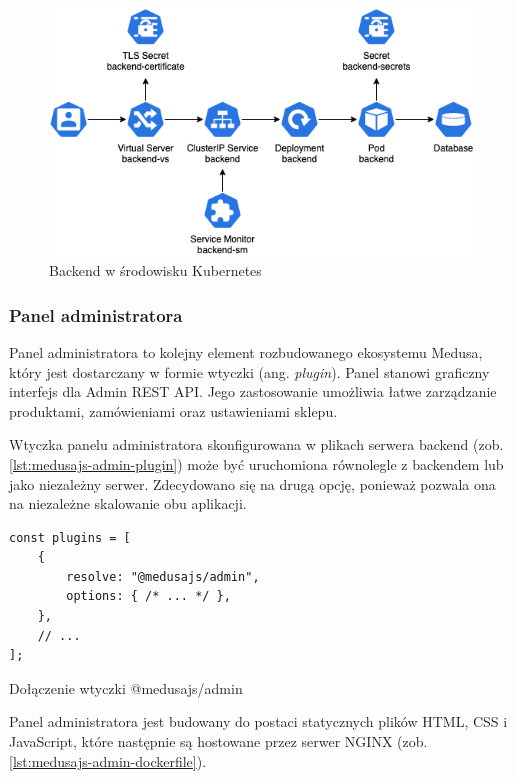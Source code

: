 \begin{figure}[H]
    \centering
    \includegraphics[width=\textwidth]{img/kubernetes-backend}
    \caption{Backend w środowisku Kubernetes}
    \label{fig:kubernetes-backend}
\end{figure}

\subsubsection{Panel administratora}

Panel administratora to kolejny element rozbudowanego ekosystemu Medusa, który jest dostarczany w formie wtyczki (ang. \emph{plugin}).
Panel stanowi graficzny interfejs dla Admin REST API. Jego zastosowanie umożliwia łatwe zarządzanie produktami, zamówieniami oraz ustawieniami sklepu.

Wtyczka panelu administratora skonfigurowana w plikach serwera backend (zob. \autoref{lst:medusajs-admin-plugin}) może być uruchomiona równolegle z backendem lub jako niezależny serwer.
Zdecydowano się na drugą opcję, ponieważ pozwala ona na niezależne skalowanie obu aplikacji.

\begin{listing}[H]
    \begin{verbatim}
const plugins = [
    {
        resolve: "@medusajs/admin",
        options: { /* ... */ },
    },
    // ...
];
    \end{verbatim}
    \caption{Dołączenie wtyczki @medusajs/admin}
    \label{lst:medusajs-admin-plugin}
\end{listing}

Panel administratora jest budowany do postaci statycznych plików HTML, CSS i JavaScript, które następnie są hostowane przez serwer NGINX (zob. \autoref{lst:medusajs-admin-dockerfile}).

